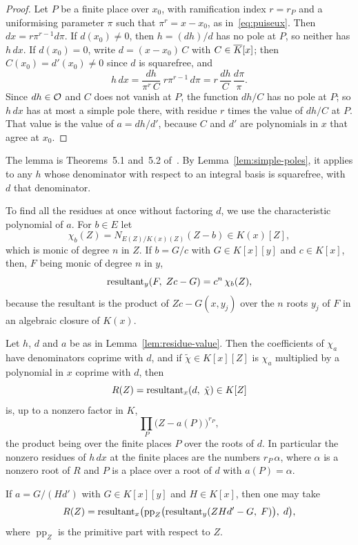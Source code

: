 \begin{proof}
Let $P$ be a finite place over $x_0$, with ramification index $r = r_P$ and a
uniformising parameter $\pi$ such that $\pi^r = x - x_0$, as
in~\eqref{eq:puiseux}. Then $dx = r \pi^{r-1} d\pi$. If $d(x_0) \ne 0$, then
$h = (dh)/d$ has no pole at $P$, so neither has $h\,dx$. If $d(x_0) = 0$,
write $d = (x - x_0)\, C$ with $C \in \overline{K}[x]$; then $C(x_0) = d'(x_0) \ne 0$
since $d$ is squarefree, and
\[
  h\,dx = \frac{d h}{\pi^r\, C}\; r \pi^{r-1}\, d\pi
        = r\, \frac{d h}{C}\, \frac{d\pi}{\pi} .
\]
Since $dh \in \mathcal{O}$ and $C$ does not vanish at $P$, the function $dh/C$ has no
pole at $P$; so $h\,dx$ has at most a simple pole there, with residue $r$
times the value of $dh/C$ at $P$. That value is the value of $a = dh/d'$,
because $C$ and $d'$ are polynomials in $x$ that agree at $x_0$.
\end{proof}

The lemma is Theorems~5.1 and~5.2 of~\cite{trager1984}. By
Lemma~\ref{lem:simple-poles}, it applies to any $h$ whose denominator with
respect to an integral basis is squarefree, with $d$ that denominator.

To find all the residues at once without factoring $d$, we use the
characteristic polynomial of $a$. For $b \in E$ let
\[
  \chi_b(Z) = N_{E(Z)/K(x)(Z)}(Z - b) \in K(x)[Z] ,
\]
which is monic of degree $n$ in $Z$. If $b = G / c$ with $G \in K[x][y]$ and
$c \in K[x]$, then, $F$ being monic of degree $n$ in $y$,
\begin{equation}\label{eq:charpoly-resultant}
  \operatorname{resultant}_y(F,\; Z c - G) = c^n\, \chi_b(Z) ,
\end{equation}
because the resultant is the product of $Z c - G(x, y_j)$ over the $n$ roots
$y_j$ of $F$ in an algebraic closure of $K(x)$.

\begin{theorem}\label{thm:residue-polynomial}
Let $h$, $d$ and $a$ be as in Lemma~\ref{lem:residue-value}. Then the
coefficients of $\chi_a$ have denominators coprime with $d$, and if $\tilde\chi
\in K[x][Z]$ is $\chi_a$ multiplied by a polynomial in $x$ coprime with $d$,
then
\[
  R(Z) = \operatorname{resultant}_x(d,\; \tilde\chi) \in K[Z]
\]
is, up to a nonzero factor in $K$,
\[
  \prod_{P} \bigl( Z - a(P) \bigr)^{r_P} ,
\]
the product being over the finite places $P$ over the roots of $d$. In
particular the nonzero residues of $h\,dx$ at the finite places are the
numbers $r_P\, \alpha$, where $\alpha$ is a nonzero root of $R$ and $P$ is a
place over a root of $d$ with $a(P) = \alpha$.

If $a = G/(H d')$ with $G \in K[x][y]$ and $H \in K[x]$, then one may take
\begin{equation}\label{eq:trager-resultant}
  R(Z) = \operatorname{resultant}_x\bigl( \operatorname{pp}_Z\bigl(
           \operatorname{resultant}_y( Z H d' - G,\; F ) \bigr),\; d \bigr) ,
\end{equation}
where $\operatorname{pp}_Z$ is the primitive part with respect to $Z$.
\end{theorem}


